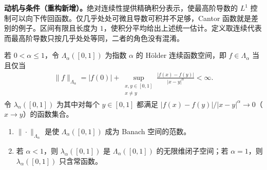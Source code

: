 \documentclass[../../main.tex]{subfiles}
\begin{document}
\begin{remark}
\textbf{动机与条件（重构新增）。}绝对连续性提供精确积分表示，使最高阶导数的 $L^1$ 控制可以向下传回函数。仅几乎处处可微且导数可积并不足够，Cantor 函数就是差别的例子。区间有限且长度为 $1$，使积分平均给出上述统一估计。定义取连续代表而最高阶导数只按几乎处处等同，二者的角色没有混淆。
\end{remark}
\begin{exercise}\label{exercise:ch05-holder-banach}
\begin{definition*}\label{definition:ch05-holder-spaces}
若 $0<\alpha\le1$，令 $\Lambda_\alpha([0,1])$ 为指数 $\alpha$ 的 Hölder 连续函数空间，即 $f\in\Lambda_\alpha$ 当且仅当
\begin{align*}
\|f\|_{\Lambda_\alpha}=|f(0)|+\sup_{\substack{x,y\in[0,1]\\x\ne y}}\frac{|f(x)-f(y)|}{|x-y|^\alpha}<\infty.
\end{align*}
令 $\lambda_\alpha([0,1])$ 为其中对每个 $y\in[0,1]$ 都满足 $|f(x)-f(y)|/|x-y|^\alpha\to0$（$x\to y$）的函数集合。
\end{definition*}
\begin{enumerate}
\item\label{item:ch05-holder-complete} $\|\cdot\|_{\Lambda_\alpha}$ 是使 $\Lambda_\alpha([0,1])$ 成为 Banach 空间的范数。
\item\label{item:ch05-little-holder} 若 $\alpha<1$，则 $\lambda_\alpha([0,1])$ 是 $\Lambda_\alpha([0,1])$ 的无限维闭子空间；若 $\alpha=1$，则 $\lambda_\alpha([0,1])$ 只含常函数。
\end{enumerate}
\end{exercise}
\end{document}
